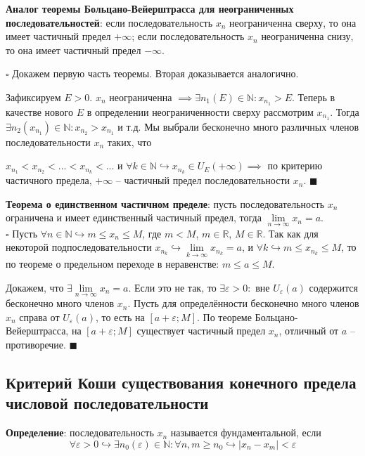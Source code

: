 \documentclass[12pt, a4paper, reqno]{article}
\begin{document}
    \textbf{Аналог теоремы Больцано-Вейерштрасса для неограниченных последовательностей}: если
    последовательность $x_n$ неограниченна сверху, то она имеет частичный предел $+\infty$; если
    последовательность $x_n$ неограниченна снизу, то она имеет частичный предел $-\infty$.

    $\square$ Докажем первую часть теоремы. Вторая доказывается аналогично.

    Зафиксируем $E > 0$. $x_n$ неограниченна $\implies \exists n_1(E)\in\mathbb{N}: x_{n_1} > E$.
    Теперь в качестве нового $E$ в определении неограниченности сверху рассмотрим $x_{n_1}$. Тогда
    $\exists n_2(x_{n_1})\in\mathbb{N}: x_{n_2} > x_{n_1}$ и т.д. Мы выбрали бесконечно много
    различных членов последовательности $x_n$ таких, что

    $x_{n_1} < x_{n_2} < ... < x_{n_k} < ...$ и $\forall k\in\mathbb{N} \hookrightarrow
    x_{n_k}\in U_{E}(+\infty) \implies$ по критерию частичного предела, $+\infty$ -- частичный предел
    последовательности $x_n$. $\blacksquare$

    \textbf{Теорема о единственном частичном пределе}: пусть последовательность $x_n$ ограничена и
    имеет единственный частичный предел, тогда $\lim\limits_{n\to\infty} x_n = a$.\\
    $\square$ Пусть $\forall n\in\mathbb{N} \hookrightarrow m
    \leq x_n \leq M$, где $m < M$, $m\in\mathbb{R}$, $M\in\mathbb{R}$. Так как для некоторой
    подпоследовательности $x_{n_k} \hookrightarrow \lim\limits_{k\to\infty} x_{n_k} = a$, и
    $\forall k \hookrightarrow m \leq x_{n_k} \leq M$, то по теореме о предельном переходе в
    неравенстве: $m \leq a \leq M$.

    Докажем, что $\exists\lim\limits_{n\to\infty} x_n = a$. Если это не так, то
    $\exists\varepsilon > 0:$ вне $U_{\varepsilon}(a)$ содержится бесконечно много членов $x_n$.
    Пусть для определённости бесконечно много членов $x_n$ справа от $U_{\varepsilon}(a)$, то есть
    на $[a + \varepsilon; M]$. По теореме Больцано-Вейерштрасса, на $[a + \varepsilon; M]$
    существует частичный предел $x_n$, отличный от $a$ -- противоречие. $\blacksquare$

\subsection{Критерий Коши существования конечного предела числовой последовательности}

    \textbf{Определение}: последовательность $x_n$ называется фундаментальной, если
    \begin{equation*}
        \forall\varepsilon > 0 \hookrightarrow \exists n_0(\varepsilon)\in\mathbb{N}: \forall n, m
        \geq n_0 \hookrightarrow |x_n - x_m| < \varepsilon
    \end{equation*}
\end{document}
